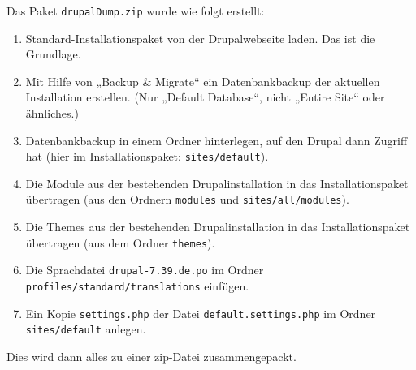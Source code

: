 \documentclass[a4paper,11pt,twoside]{article}
\begin{document}
Das Paket \texttt{drupalDump.zip} wurde wie folgt erstellt: 

\begin{enumerate}\itemsep0pt
\item Standard-Installationspaket von der Drupalwebseite laden. Das ist die
  Grundlage.
\item Mit Hilfe von „Backup \& Migrate“ ein Datenbankbackup der aktuellen
  Installation erstellen. (Nur „Default Database“, nicht „Entire Site“ oder
  ähnliches.)
\item Datenbankbackup in einem Ordner hinterlegen, auf den Drupal dann Zugriff
  hat (hier im Installationspaket: \texttt{sites/default}).
\item Die Module aus der bestehenden Drupalinstallation in das
  Installationspaket übertragen (aus den Ordnern \texttt{modules} und
  \texttt{sites/all/modules}).
\item Die Themes aus der bestehenden Drupalinstallation in das
  Installationspaket übertragen (aus dem Ordner \texttt{themes}).
\item Die Sprachdatei \texttt{drupal-7.39.de.po} im Ordner
  \texttt{profiles/standard/translations} einfügen.
\item Ein Kopie \texttt{settings.php} der Datei \texttt{default.settings.php}
  im Ordner \texttt{sites/default} anlegen.
\end{enumerate}
Dies wird dann alles zu einer zip-Datei zusammengepackt.
\end{document}
